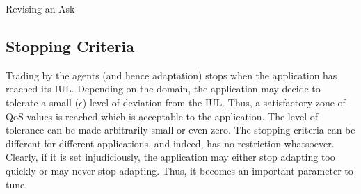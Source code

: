 \documentclass[10pt,journal,compsoc]{IEEEtran}
\begin{document}
\begin{algorithm}
 \DontPrintSemicolon
  \caption{Revising an Ask}
  \label{ask_revision}   
 \end{algorithm}
 
\subsection{Stopping Criteria}
Trading by the agents (and hence adaptation) stops when the application has reached its IUL. Depending on the domain, the application may decide to tolerate a small ($\epsilon$) level of deviation from the IUL. Thus, a satisfactory zone of QoS values is reached which is acceptable to the application. The level of tolerance can be made arbitrarily small or even zero. The stopping criteria can be different for different applications, and indeed, has no restriction whatsoever. Clearly, if it is set injudiciously, the application may either stop adapting too quickly or may never stop adapting. Thus, it becomes an important parameter to tune.
\end{document}
